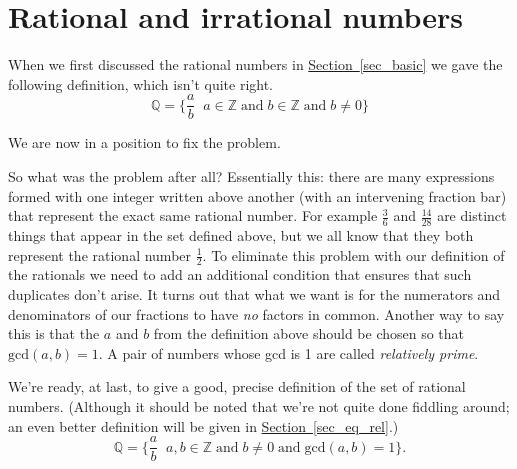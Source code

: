 \documentclass[10pt,]{book}
\theoremstyle{plain}
\theoremstyle{definition}
\theoremstyle{definition}
\numberwithin{equation}{section}
\newcommand{\suchthat}{\;  \;}
\renewcommand{\gcd}[2]{\mbox{gcd} (#1, #2)}
\newcommand{\Integers}{{\mathbb Z}}
\newcommand{\Rationals}{{\mathbb Q}}
\begin{document}
\section[{Rational and irrational numbers}]{Rational and irrational numbers}\label{sec_rat}

    When we first discussed the rational numbers in \hyperref[sec_basic]{Section~\ref{sec_basic}}
    we gave the following definition, which isn't quite right.
    \begin{equation*}
      \Rationals = \{ \frac{a}{b} \suchthat a \in \Integers \; \mbox{and}  \;
      b \in \Integers \; \mbox{and}  \; b \neq 0 \}
    \end{equation*}
\par

    We are now in a position to fix the problem.
\par

    So what was the problem after all? Essentially this: there are
    many expressions formed with one integer written above another (with an
    intervening fraction bar) that represent the exact same rational
    number. For example \(\frac{3}{6}\) and \(\frac{14}{28}\) are distinct
    things that appear in the set defined above, but we all know that they
    both represent the rational number \(\frac{1}{2}\). To eliminate this
    problem with our definition of the rationals we need to add an
    additional condition that ensures that such duplicates don't arise.
    It turns out that what we want is for the numerators and denominators
    of our fractions to have \emph{no} factors in common. Another way to
    say this is that the \(a\) and \(b\) from the definition above should be
    chosen so that \(\gcd{a}{b} = 1\). A pair of numbers whose gcd is 1 are
    called  \emph{relatively prime}.
\par

    We're ready, at last, to give a good, precise definition of the set
    of rational numbers. (Although it should be noted that we're not
    quite done fiddling around; an even better definition will be given in
    \hyperref[sec_eq_rel]{Section~\ref{sec_eq_rel}}.)
    \begin{equation*}
      \Rationals = \{ \frac{a}{b} \suchthat a,b \in \Integers \; \mbox{and}  \;
      b \neq 0 \; \mbox{and}  \; \gcd{a}{b}=1 \}.
    \end{equation*}
\par
\end{document}
